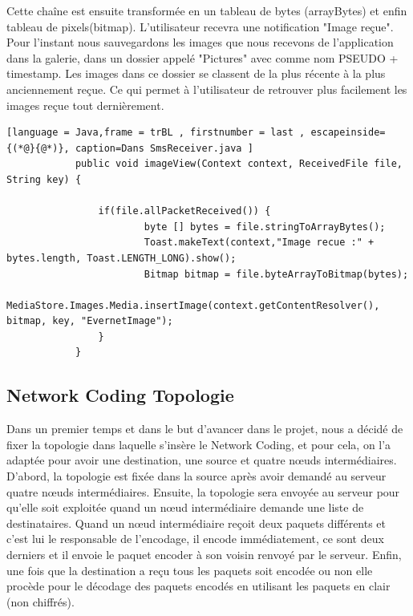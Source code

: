         Cette chaîne  est ensuite transformée  en un tableau de bytes (arrayBytes) et enfin tableau de pixels(bitmap). L'utilisateur recevra une notification "Image reçue". \\
         Pour l'instant nous sauvegardons les images que nous recevons de l'application dans la galerie, dans un dossier appelé "Pictures" avec comme nom PSEUDO + timestamp. Les images dans ce dossier se classent de la plus récente à la plus anciennement reçue. Ce qui permet à l'utilisateur de retrouver plus facilement les images reçue tout dernièrement.\\
       
       \begin{lstlisting}[language = Java,frame = trBL , firstnumber = last , escapeinside={(*@}{@*)}, caption=Dans SmsReceiver.java ]
            public void imageView(Context context, ReceivedFile file, String key) {

                if(file.allPacketReceived()) {
                        byte [] bytes = file.stringToArrayBytes();
                        Toast.makeText(context,"Image recue :" + bytes.length, Toast.LENGTH_LONG).show();
                        Bitmap bitmap = file.byteArrayToBitmap(bytes);
                        MediaStore.Images.Media.insertImage(context.getContentResolver(), bitmap, key, "EvernetImage");
                }
            }
       \end{lstlisting}
      
        \subsection{Network Coding Topologie}
        
            Dans un premier temps et dans le but d'avancer dans le projet, nous a décidé de fixer la topologie dans laquelle s'insère le Network Coding, et pour cela, on l'a adaptée pour avoir une destination, une source et quatre nœuds intermédiaires. D’abord, la topologie est fixée dans la source après avoir demandé au serveur quatre nœuds intermédiaires. Ensuite, la topologie sera envoyée au serveur pour qu’elle soit exploitée quand un nœud intermédiaire demande une liste de destinataires. Quand un nœud intermédiaire reçoit deux paquets différents et c’est lui le responsable de l’encodage, il encode immédiatement, ce sont deux derniers et il envoie le paquet encoder à son voisin renvoyé par le serveur. Enfin, une fois que la destination a reçu tous les paquets soit encodée ou non elle procède pour le décodage des paquets encodés en utilisant les paquets en clair (non chiffrés).
        
